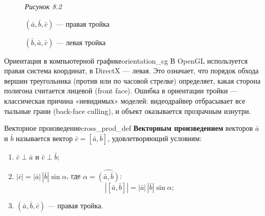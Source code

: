 \documentclass[12pt,a4paper]{article}
\newcommand{\va}{\bar{a}}
\newcommand{\vb}{\bar{b}}
\newcommand{\vc}{\bar{c}}
\begin{document}
\begin{figure}[ht]
  \centering
  \begin{minipage}{0.45\textwidth}
    \centering

    \smallskip
    \textit{Рисунок 8.2}
  \end{minipage}
  \hfill
  \begin{minipage}{0.45\textwidth}
    $(\va, \vb, \vc)$ --- правая тройка

    $(\vb, \va, \vc)$ --- левая тройка
  \end{minipage}
\end{figure}

\begin{remarkIT}{Ориентация в компьютерной графике}{orientation_cg}
  В OpenGL используется правая система координат, в DirectX --- левая.
  Это означает, что порядок обхода вершин треугольника (против или по
  часовой стрелке) определяет, какая сторона полигона считается лицевой
  (front face). Ошибка в ориентации тройки --- классическая причина
  «невидимых» моделей: видеодрайвер отбрасывает все тыльные грани
  (back-face culling), и объект оказывается прозрачным изнутри.
\end{remarkIT}

\begin{definition}{Векторное произведение}{cross_prod_def}
  \textbf{Векторным произведением} векторов $\va$ и $\vb$ называется
  вектор $\vc = [\va, \vb]$, удовлетворяющий условиям:
  \begin{enumerate}
    \item $\vc \perp \va$ и $\vc \perp \vb$;
    \item $|\vc| = |\va|\,|\vb|\sin\alpha$, где $\alpha = \widehat{(\va,\vb)}$:
      \begin{equation}
        |[\va,\vb]| = |\va|\,|\vb|\sin\alpha; \tag{8.4}
      \end{equation}
    \item $(\va, \vb, \vc)$ --- правая тройка.
  \end{enumerate}
\end{definition}
\end{document}
